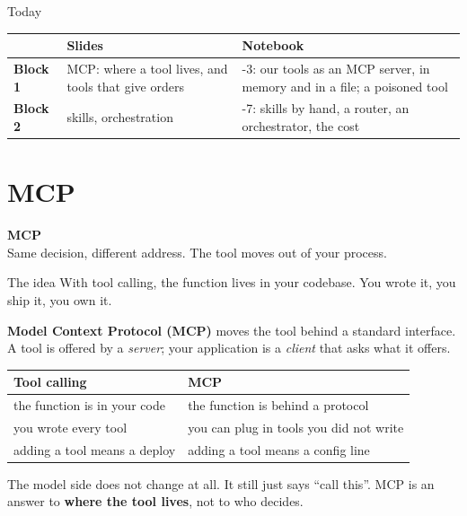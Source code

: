 \documentclass[aspectratio=169]{beamer}
\newcommand{\keybox}[1]{%
  \begin{tcolorbox}[colback=armblue!8, colframe=armblue, boxrule=0.6pt, arc=2pt]
  #1
  \end{tcolorbox}}
\newcommand{\sectiontransition}[2]{%
  \begin{frame}[plain]
    \vfill
    \begin{center}
      {\Huge\bfseries\color{popblue} #1}\\[1.1em]
      {\large #2}
    \end{center}
    \vfill
  \end{frame}}
\begin{document}
\begin{frame}{Today}
  \vspace{0.6em}
  \begin{center}
  \small
  \begin{tabular}{l>{\raggedright\arraybackslash}p{}>{\raggedright\arraybackslash}p{}}
    \toprule
    & \textbf{Slides} & \textbf{Notebook} \\
    \midrule
    \textbf{Block 1} & MCP: where a tool lives, and tools that give orders
      & 1-3: our tools as an MCP server, in memory and in a file; a poisoned tool \\[0.3em]
    \textbf{Block 2} & skills, orchestration & 4-7: skills by hand, a router, an orchestrator, the cost \\
    \bottomrule
  \end{tabular}
  \end{center}
\end{frame}

\section{MCP}
\sectiontransition{MCP}{Same decision, different address. The tool moves out of your process.}

\begin{frame}{The idea}
  \vspace{0.3em}
  With tool calling, the function lives in your codebase. You wrote it, you ship it, you own it.

  \vspace{0.4em}
  \textbf{Model Context Protocol (MCP)} moves the tool behind a standard interface. A tool is offered by a
  \emph{server}; your application is a \emph{client} that asks what it offers.

  \vspace{0.4em}
  \begin{center}
  \small
  \begin{tabular}{ll}
    \toprule
    \textbf{Tool calling} & \textbf{MCP} \\
    \midrule
    the function is in your code & the function is behind a protocol \\
    you wrote every tool & you can plug in tools you did not write \\
    adding a tool means a deploy & adding a tool means a config line \\
    \bottomrule
  \end{tabular}
  \end{center}

  \vspace{0.35em}
  \keybox{The model side does not change at all. It still just says ``call this''. MCP is an answer to
  \textbf{where the tool lives}, not to who decides.}
\end{frame}
\end{document}
